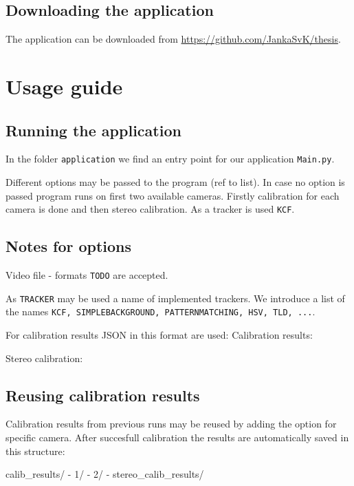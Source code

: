 \subsection{Downloading the application}
The application can be downloaded from \url{https://github.com/JankaSvK/thesis}.

\section{Usage guide}

\subsection{Running the application}
In the folder \verb+application+ we find an entry point for our application
\verb+Main.py+.

Different options may be passed to the program (ref to list). In case no option
is passed program runs on first two available cameras. Firstly calibration for
each camera is done and then stereo calibration. As a tracker is used \verb+KCF+.

\begin{code}
\end{code}

\subsection{Notes for options}
Video file
- formats \verb+TODO+ are accepted.

As \verb+TRACKER+ may be used a name of implemented trackers. We introduce a list of the names \verb+KCF, SIMPLEBACKGROUND, PATTERNMATCHING, HSV, TLD, ...+.

For calibration results JSON in this format are used:
Calibration results:


Stereo calibration:
\begin{code}

\end{code}
\subsection{Reusing calibration results}
Calibration results from previous runs may be reused by adding the option for specific camera. After succesfull calibration the results are automatically saved in this structure:

\begin{code}
calib\_results/
 - 1/
 - 2/
 - stereo\_calib\_results/
\end{code} 	


